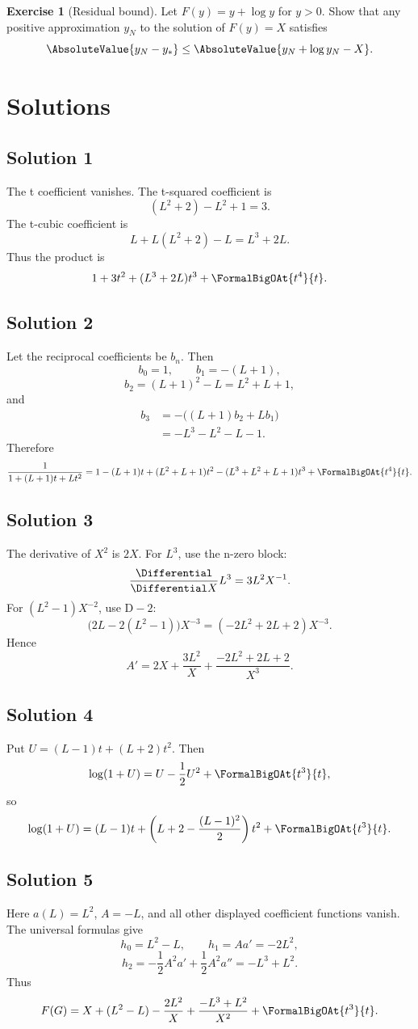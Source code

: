 \documentclass[11pt,openany]{book}
\theoremstyle{definition}
\newtheorem{exercise}{Exercise}[chapter]
\theoremstyle{plain}
\theoremstyle{remark}
\newcommand{\Dop}{\mathrm{D}}
\begin{document}
\begin{exercise}[Residual bound]
Let \(F(y)=y+\log y\) for \(y>0\).  Show that any positive approximation
\(y_N\) to the solution of \(F(y)=X\) satisfies
\[
 \AbsoluteValue{y_N-y_*}\le\AbsoluteValue{y_N+\log y_N-X}.
\]
\end{exercise}

\section{Solutions}

\subsection*{Solution 1}
The t coefficient vanishes.  The t-squared coefficient is
\[
 (L^2+2)-L^2+1=3.
\]
The t-cubic coefficient is
\[
 L+L(L^2+2)-L=L^3+2L.
\]
Thus the product is
\[
 1+3t^2+(L^3+2L)t^3+\FormalBigOAt{t^4}{t}.
\]

\subsection*{Solution 2}
Let the reciprocal coefficients be \(b_n\).  Then
\[
 b_0=1,
 \qquad b_1=-(L+1),
\]
\[
 b_2=(L+1)^2-L=L^2+L+1,
\]
and
\begin{align*}
 b_3&=-\bigl((L+1)b_2+Lb_1\bigr)\\
 &=-L^3-L^2-L-1.
\end{align*}
Therefore
\[
 \frac1{1+(L+1)t+Lt^2}
 =1-(L+1)t+(L^2+L+1)t^2
 -(L^3+L^2+L+1)t^3+\FormalBigOAt{t^4}{t}.
\]

\subsection*{Solution 3}
The derivative of \(X^2\) is \(2X\).  For \(L^3\), use the n-zero block:
\[
 \frac{\Differential}{\Differential X}L^3=3L^2X^{-1}.
\]
For \((L^2-1)X^{-2}\), use \(\Dop-2\):
\[
 \bigl(2L-2(L^2-1)\bigr)X^{-3}
 =(-2L^2+2L+2)X^{-3}.
\]
Hence
\[
 A'=2X+\frac{3L^2}{X}
 +\frac{-2L^2+2L+2}{X^3}.
\]

\subsection*{Solution 4}
Put \(U=(L-1)t+(L+2)t^2\).  Then
\[
 \log(1+U)=U-\frac12U^2+\FormalBigOAt{t^3}{t},
\]
so
\[
 \log(1+U)
 =(L-1)t+
 \left(L+2-\frac{(L-1)^2}{2}\right)t^2+\FormalBigOAt{t^3}{t}.
\]

\subsection*{Solution 5}
Here \(a(L)=L^2\), \(A=-L\), and all other displayed coefficient functions
vanish.  The universal formulas give
\[
 h_0=L^2-L,
 \qquad
 h_1=Aa'=-2L^2,
\]
\[
 h_2=-\frac12A^2a'+\frac12A^2a''
 =-L^3+L^2.
\]
Thus
\[
 F(G)=X+(L^2-L)-\frac{2L^2}{X}
 +\frac{-L^3+L^2}{X^2}+\FormalBigOAt{t^3}{t}.
\]
\end{document}
